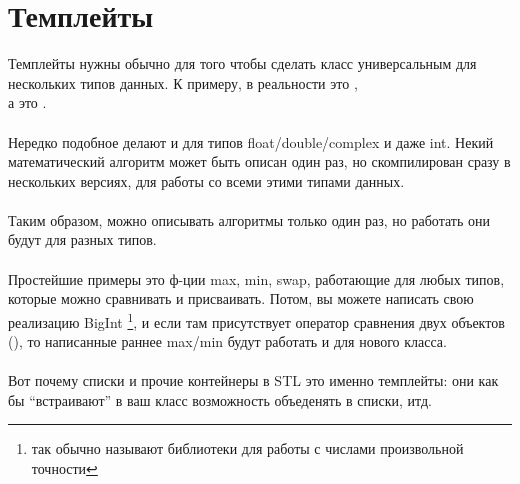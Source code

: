 \section{Темплейты}

Темплейты нужны обычно для того чтобы сделать класс универсальным для нескольких типов данных.
К примеру,  в реальности это , \\ 
а  это . \\
\\
Нередко подобное делают и для типов float/double/complex и даже int. 
Некий математический алгоритм может быть описан один раз,
но скомпилирован сразу в нескольких версиях, для работы со всеми этими типами данных. \\
\\
Таким образом, можно описывать алгоритмы только один раз, но работать они будут для разных типов. \\
\\
Простейшие примеры это ф-ции max, min, swap, работающие для любых типов, которые можно сравнивать
и присваивать. Потом, вы можете написать свою реализацию BigInt
\footnote{так обычно называют библиотеки для работы с числами произвольной точности}, 
и если там присутствует 
оператор сравнения двух объектов (),
то написанные раннее max/min будут работать и для нового класса.\\
\\
Вот почему списки и прочие контейнеры в \ac{STL} это именно темплейты: они как бы 
``встраивают'' в ваш класс возможность объеденять в списки, итд.

